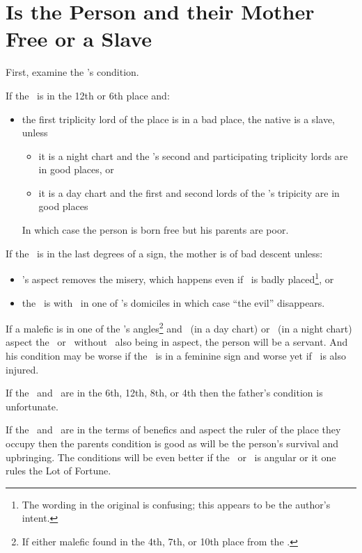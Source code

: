 \section{Is the Person and their Mother Free or a Slave}

First, examine the \Moon's condition. 

If the \Moon\, is in the 12th or 6th place and:
\begin{itemize}[topsep=0em, itemsep=0em]
\item the first triplicity lord of the place is in a bad place, the native is a slave, unless
\begin{itemize}[topsep=0em, itemsep=0em]
\item it is a night chart and the \Moon's second and participating triplicity lords are in good places, or
\item it is a day chart and the first and second lords of the \Sun's tripicity are in good places
\end{itemize}
In which case the person is born free but his parents are poor.
\end{itemize}

If the \Moon\, is in the last degrees of a sign, the mother is of bad descent unless:
\begin{itemize}[topsep=0em, itemsep=0em]
\item  \Jupiter's aspect removes the misery, which happens even if \Jupiter\, is badly placed\footnote{The wording in the original is confusing; this appears to be the author's intent.}, or

\item the \Moon\, is with \Venus\, in one of \Venus's domiciles in which case ``the evil'' disappears.
\end{itemize}

If a malefic is in one of the \Moon's angles\footnote{If either malefic found in the 4th, 7th, or 10th place from the \Moon.} and \Mars\, (in a day chart) or \Saturn\, (in a night chart) aspect the \Sun\, or \Moon\, without \Jupiter\, also being in aspect, the person will be a servant. And his condition may be worse if the \Moon\, is in a feminine sign and worse yet if \Venus\, is also injured.

If the \Sun\, and \Saturn\, are in the 6th, 12th, 8th, or 4th then the father's condition is unfortunate.

If the \Sun\, and \Moon\, are in the terms of benefics and aspect the ruler of the place they occupy then the parents condition is good as will be the person's survival and upbringing. The conditions will be even better if  the \Sun\, or \Moon\, is angular or it one rules the Lot of Fortune.


